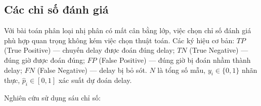 \subsection{Các chỉ số đánh giá}

Với bài toán phân loại nhị phân có mất cân bằng lớp,
việc chọn chỉ số đánh giá phù hợp quan trọng không kém việc chọn thuật toán.
Các ký hiệu cơ bản:
$TP$ (True Positive) --- chuyến delay được đoán đúng delay;
$TN$ (True Negative) --- đúng giờ được đoán đúng;
$FP$ (False Positive) --- đúng giờ bị đoán nhầm thành delay;
$FN$ (False Negative) --- delay bị bỏ sót.
$N$ là tổng số mẫu, $y_i \in \{0, 1\}$ nhãn thực,
$\hat{p}_i \in [0, 1]$ xác suất dự đoán delay.

Nghiên cứu sử dụng sáu chỉ số:

